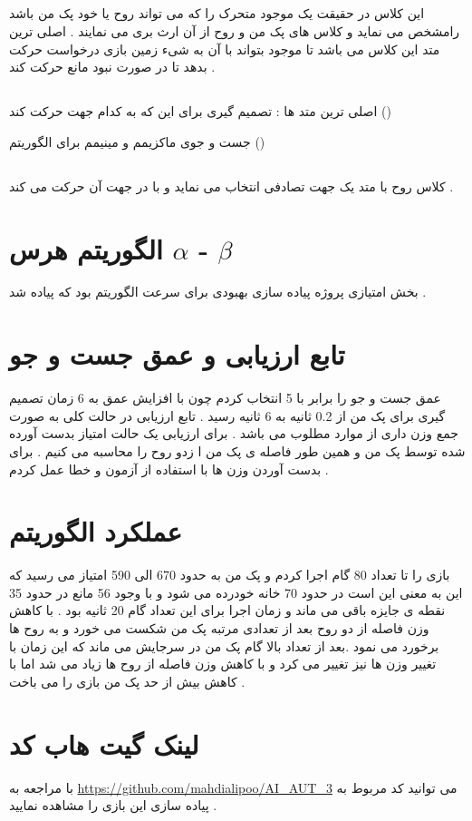 \subsection{}
این کلاس در حقیقت یک موجود متحرک را که می تواند روح یا خود پک من باشد رامشخص می نماید و کلاس های پک من و روح از آن ارث بری می نمایند . اصلی ترین متد این کلاس 
می باشد تا موجود بتواند با آن به شیء زمین بازی 
 درخواست حرکت بدهد تا در صورت نبود مانع حرکت کند . 
\subsection{}
اصلی ترین متد ها : تصمیم گیری برای این که به کدام جهت حرکت کند 
 ()

جست و جوی ماکزیمم و مینیمم برای الگوریتم 
 ()

\subsection{}
کلاس روح با متد 
یک جهت تصادفی انتخاب می نماید و با 
در جهت آن حرکت می کند .
\section{الگوریتم هرس $\alpha$ - $\beta$}
بخش امتیازی پروژه پیاده سازی بهبودی برای سرعت الگوریتم بود که پیاده شد .
\section{تابع ارزیابی و عمق جست و جو}
عمق جست و جو  را برابر با 5 انتخاب کردم چون با افزایش عمق به 6 زمان تصمیم گیری برای پک من از 0.2 ثانیه به 6 ثانیه رسید .
 تابع ارزیابی در حالت کلی به صورت جمع وزن داری از موارد مطلوب می باشد . برای ارزیابی یک حالت امتیاز بدست آورده شده توسط پک من و همین طور فاصله ی پک من ا زدو روح را محاسبه می کنیم . برای بدست آوردن وزن ها با استفاده از آزمون و خطا عمل کردم .
\section{عملکرد الگوریتم}
بازی را تا تعداد 80 گام اجرا کردم و پک من به حدود 670 الی 590 امتیاز می رسید  که  این به معنی این است در حدود 70 خانه خودرده می شود و با وجود 56 مانع در حدود 35 نقطه ی جایزه باقی می ماند و زمان اجرا برای این تعداد گام 20 ثانیه بود . با کاهش وزن فاصله از دو روح بعد از تعدادی مرتبه پک من شکست می خورد و به روح ها برخورد می نمود .بعد از تعداد بالا گام پک من در سرجایش می ماند که این زمان با تغییر وزن ها نیز تغییر می کرد و با کاهش وزن فاصله از روح ها زیاد می شد اما با کاهش بیش از حد پک من بازی را می باخت .
\section{لینک گیت هاب کد}
با مراجعه به 
\url{https://github.com/mahdialipoo/AI_AUT_3}
می توانید کد مربوط به پیاده سازی این بازی را مشاهده نمایید .
